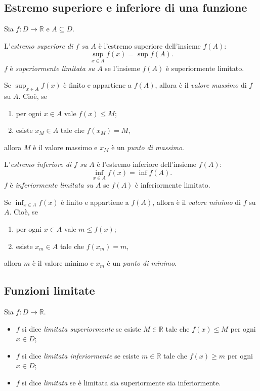 \documentclass[11pt,a4paper]{article}
\begin{document}
\subsection{Estremo superiore e inferiore di una funzione}

Sia $f : D \to \mathbb{R}$ e $A \subseteq D$.

\begin{definizione}
L'\emph{estremo superiore di $f$ su $A$} è l'estremo superiore dell'insieme $f(A)$:
\[
\sup_{x \in A} f(x) = \sup f(A).
\]
$f$ è \emph{superiormente limitata su $A$} se l'insieme $f(A)$ è superiormente limitato.
\end{definizione}

Se $\sup_{x \in A} f(x)$ è finito e appartiene a $f(A)$, allora è il \emph{valore massimo} di $f$ su $A$. Cioè, se
\begin{enumerate}
    \item per ogni $x \in A$ vale $f(x) \leq M$;
    \item esiste $x_M \in A$ tale che $f(x_M) = M$,
\end{enumerate}
allora $M$ è il valore massimo e $x_M$ è un \emph{punto di massimo}.

\begin{definizione}
L'\emph{estremo inferiore di $f$ su $A$} è l'estremo inferiore dell'insieme $f(A)$:
\[
\inf_{x \in A} f(x) = \inf f(A).
\]
$f$ è \emph{inferiormente limitata su $A$} se $f(A)$ è inferiormente limitato.
\end{definizione}

Se $\inf_{x \in A} f(x)$ è finito e appartiene a $f(A)$, allora è il \emph{valore minimo} di $f$ su $A$. Cioè, se
\begin{enumerate}
    \item per ogni $x \in A$ vale $m \leq f(x)$;
    \item esiste $x_m \in A$ tale che $f(x_m) = m$,
\end{enumerate}
allora $m$ è il valore minimo e $x_m$ è un \emph{punto di minimo}.

\subsection{Funzioni limitate}

Sia $f : D \to \mathbb{R}$.

\begin{definizione}
\begin{itemize}
    \item $f$ si dice \emph{limitata superiormente} se esiste $M \in \mathbb{R}$ tale che $f(x) \leq M$ per ogni $x \in D$;
    \item $f$ si dice \emph{limitata inferiormente} se esiste $m \in \mathbb{R}$ tale che $f(x) \geq m$ per ogni $x \in D$;
    \item $f$ si dice \emph{limitata} se è limitata sia superiormente sia inferiormente.
\end{itemize}
\end{definizione}
\end{document}
